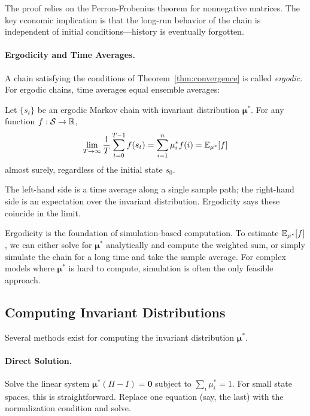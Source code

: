 The proof relies on the Perron-Frobenius theorem for nonnegative matrices. The key economic implication is that the long-run behavior of the chain is independent of initial conditions---history is eventually forgotten.

\paragraph{Ergodicity and Time Averages.}
A chain satisfying the conditions of Theorem~\ref{thm:convergence} is called \emph{ergodic}. For ergodic chains, time averages equal ensemble averages:

\begin{theorem}
\label{thm:ergodic}
Let $\{s_t\}$ be an ergodic Markov chain with invariant distribution $\boldsymbol{\mu}^*$. For any function $f: \mathcal{S} \to \mathbb{R}$,
\begin{equation}
\lim_{T \to \infty} \frac{1}{T} \sum_{t=0}^{T-1} f(s_t) = \sum_{i=1}^{n} \mu_i^* f(i) = \mathbb{E}_{\mu^*}[f]
\label{eq:ergodic-theorem}
\end{equation}
almost surely, regardless of the initial state $s_0$.
\end{theorem}

The left-hand side is a time average along a single sample path; the right-hand side is an expectation over the invariant distribution. Ergodicity says these coincide in the limit.

\begin{calloutnote}
Ergodicity is the foundation of simulation-based computation. To estimate $\mathbb{E}_{\mu^*}[f]$, we can either solve for $\boldsymbol{\mu}^*$ analytically and compute the weighted sum, or simply simulate the chain for a long time and take the sample average. For complex models where $\boldsymbol{\mu}^*$ is hard to compute, simulation is often the only feasible approach.
\end{calloutnote}

\subsection{Computing Invariant Distributions}
\label{subsec:computing-invariant}

Several methods exist for computing the invariant distribution $\boldsymbol{\mu}^*$.

\paragraph{Direct Solution.}
Solve the linear system $\boldsymbol{\mu}^* (\Pi - I) = \mathbf{0}$ subject to $\sum_i \mu_i^* = 1$. For small state spaces, this is straightforward. Replace one equation (say, the last) with the normalization condition and solve.

